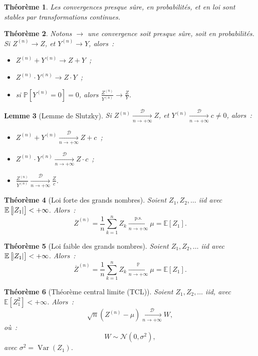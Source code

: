 \documentclass{report}
\DeclareMathOperator{\Var}{Var}
\renewcommand{\P}{\mathbb P}
\newcommand{\E}{\mathbb E}
\newcommand{\pinfty}{{+\infty}}
\newcommand{\cvgp}{\xrightarrow[n \to \pinfty]{\P}}
\newcommand{\cvgd}{\xrightarrow[n \to \pinfty]{\mathcal D}}
\newcommand{\ps}{{\text{p.s.}}}
\newcommand{\cvgps}{\xrightarrow[n \to \pinfty]\ps}
\newtheorem{thm}{Théorème}[chapter]
\newtheorem{lem}[thm]{Lemme}
\theoremstyle{definition}
\theoremstyle{remark}
\begin{document}
			\begin{thm} Les convergences presque sûre, en probabilités, et en loi sont stables par transformations continues.
			\end{thm}

			\begin{thm}\label{thm:propconvg} Notons $\to$ une convergence soit presque sûre, soit en probabilités. Si $Z^{(n)} \to Z$, et $Y^{(n)} \to Y$, alors~:
			\begin{itemize}
				\item[$(i)$]   $Z^{(n)} + Y^{(n)} \to Z+Y$~;
				\item[$(ii)$]  $Z^{(n)} \cdot Y^{(n)} \to Z \cdot Y$~;
				\item[$(iii)$] si $\P[Y^{(n)} = 0] = 0$, alors $\frac {Z^{(n)}}{Y^{(n)}} \to \frac ZY$.
			\end{itemize}
			\end{thm}

			\begin{lem}[Lemme de Slutzky] Si $Z^{(n)} \cvgd Z$, et $Y^{(n)} \cvgd c \neq 0$, alors~:
			\begin{itemize}
				\item[$(i)$]   $Z^{(n)} + Y^{(n)} \cvgd Z+c$~;
				\item[$(ii)$]  $Z^{(n)} \cdot Y^{(n)} \cvgd Z \cdot c$~;
				\item[$(iii)$] $\frac {Z^{(n)}}{Y^{(n)}} \cvgd \frac Zc$.
			\end{itemize}
			\end{lem}

			\begin{thm}[Loi forte des grands nombres] Soient $Z_1, Z_2, \ldots$ iid avec $\E\left[\abs {Z_1}\right] < \pinfty$. Alors~:
			\[\overline Z^{(n)} = \frac 1n\sum_{k=1}^nZ_k \cvgps \mu = \E[Z_1].\]
			\end{thm}

			\begin{thm}[Loi faible des grands nombres] Soient $Z_1, Z_2, \ldots$ iid avec $\E\left[\abs {Z_1}\right] < \pinfty$. Alors~:
			\[\overline Z^{(n)} = \frac 1n\sum_{k=1}^nZ_k \cvgp \mu = \E[Z_1].\]
			\end{thm}

			\begin{thm}[Théorème central limite (TCL)] Soient $Z_1, Z_2, \ldots$ iid, avec $\E[Z_1^2] < \pinfty$. Alors~:
			\[\sqrt n\left(Z^{(n)} - \mu\right) \cvgd W,\]
			où~:
			\[W \sim \mathcal N(0, \sigma^2),\]
			avec $\sigma^2 = \Var(Z_1)$.
			\end{thm}
\end{document}
